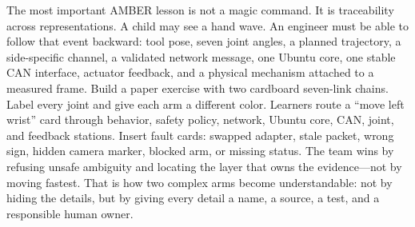 {}
\markdownRendererSectionEnd \markdownRendererSectionBegin
{}\markdownRendererInterblockSeparator
{}The most important AMBER lesson is not a magic command. It is traceability across representations. A child may see a hand wave. An engineer must be able to follow that event backward: tool pose, seven joint angles, a planned trajectory, a side-specific channel, a validated network message, one Ubuntu core, one stable CAN interface, actuator feedback, and a physical mechanism attached to a measured frame.\markdownRendererParagraphSeparator
{}Build a paper exercise with two cardboard seven-link chains. Label every joint and give each arm a different color. Learners route a “move left wrist” card through behavior, safety policy, network, Ubuntu core, CAN, joint, and feedback stations. Insert fault cards: swapped adapter, stale packet, wrong sign, hidden camera marker, blocked arm, or missing status. The team wins by refusing unsafe ambiguity and locating the layer that owns the evidence—not by moving fastest.\markdownRendererParagraphSeparator
{}That is how two complex arms become understandable: not by hiding the details, but by giving every detail a name, a source, a test, and a responsible human owner.
\markdownRendererSectionEnd \markdownRendererDocumentEnd